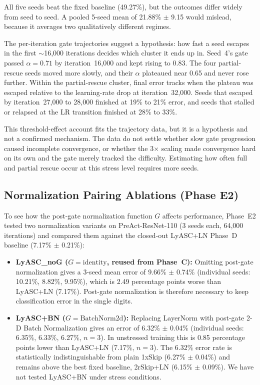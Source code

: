 \documentclass[conference,10pt]{IEEEtran}
\begin{document}
All five seeds beat the fixed baseline (49.27\%), but the outcomes
differ widely from seed to seed. A pooled 5-seed mean of 21.88\% $\pm$
9.15 would mislead, because it averages two qualitatively different
regimes.

The per-iteration gate trajectories suggest a hypothesis: how fast a
seed escapes in the first $\sim$16,000 iterations decides which cluster
it ends up in. Seed~4's gate passed $\alpha = 0.71$ by iteration~16,000
and kept rising to 0.83. The four partial-rescue seeds moved more
slowly, and their $\alpha$ plateaued near 0.65 and never rose further.
Within the partial-rescue cluster, final error tracks when the plateau
was escaped relative to the learning-rate drop at iteration~32,000.
Seeds that escaped by iteration~27,000 to 28,000 finished at 19\% to
21\% error, and seeds that stalled or relapsed at the LR transition
finished at 28\% to 33\%.

This threshold-effect account fits the trajectory data, but it is a
hypothesis and not a confirmed mechanism. The data do not settle whether
slow gate progression caused incomplete convergence, or whether the
3$\times$ scaling made convergence hard on its own and the gate merely
tracked the difficulty. Estimating how often full and partial rescue
occur at this stress level requires more seeds.


\subsection{Normalization Pairing Ablations (Phase E2)}
\label{sec:phasee2}

To see how the post-gate normalization function $G$ affects performance, Phase~E2 tested two normalization variants on PreAct-ResNet-110 (3 seeds each, 64,000 iterations) and compared them against the closed-out LyASC+LN Phase~D baseline (7.17\% $\pm$ 0.21\%):
\begin{itemize}
    \item \textbf{LyASC\_noG ($G = \text{identity}$, reused from Phase~C):} Omitting post-gate normalization gives a 3-seed mean error of 9.66\% $\pm$ 0.74\% (individual seeds: 10.21\%, 8.82\%, 9.95\%), which is 2.49 percentage points worse than LyASC+LN (7.17\%). Post-gate normalization is therefore necessary to keep classification error in the single digits.
    \item \textbf{LyASC+BN ($G = \text{BatchNorm2d}$):} Replacing LayerNorm with post-gate 2-D Batch Normalization gives an error of 6.32\% $\pm$ 0.04\% (individual seeds: 6.35\%, 6.33\%, 6.27\%, $n=3$). In unstressed training this is 0.85 percentage points lower than LyASC+LN (7.17\%, $n=3$). The 6.32\% error rate is statistically indistinguishable from plain 1xSkip (6.27\% $\pm$ 0.04\%) and remains above the best fixed baseline, 2rSkip+LN (6.15\% $\pm$ 0.09\%). We have not tested LyASC+BN under stress conditions.
\end{itemize}
\end{document}
